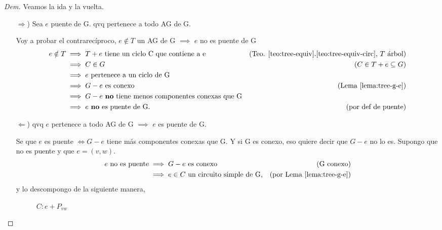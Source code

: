 \documentclass[12pt, a4paper]{report}
\theoremstyle{definition} %
\begin{document}
\begin{proof}[Dem]
    Veamos la ida y la vuelta.

    \begin{enumerate}
        \item[$\Rightarrow$)] Sea $e$ puente de G. qvq pertenece a todo AG de G.
         
        Voy a probar el contrarecíproco, $e \notin T$ un AG de G $\implies$ $e$ no es puente de G
        \begin{align*}
            e \notin T &\implies T+e\ \text{tiene un ciclo C que contiene a e} & \text{(Teo. \ref{teo:tree-equiv}.\ref{teo:tree-equiv-circ}, $T$ árbol)}\\
            &\implies C \in G &(C \in T+e \subseteq G)\\
            &\implies e \text{ pertenece a un ciclo de G}\\
            &\implies G - e \text{ es conexo} &\text{(Lema \ref{lema:tree-g-e})}\\
            &\implies G - e \text{ \textbf{no} tiene menos componentes conexas que G}\\
            &\implies e \text{ \textbf{no} es puente de G.} &\text{(por def de puente)}
        \end{align*}

        \item[$\Leftarrow$)] qvq $e$ pertenece a todo AG de G $\implies$ $e$ es puente de G.

        Se que $e$ es puente $\iff G - e$ tiene más componentes conexas que G. Y si G es conexo, eso quiere decir que $G - e$ no lo es. Supongo que no es puente y que $e = (v, w)$.
        \begin{align*}
            e\ \text{no es puente} &\implies G - e\ \text{es conexo}    & (\text{G conexo})\\
            &\implies e \in C\ \text{un circuito simple de G,} & (\text{por Lema \ref{lema:tree-g-e}})
        \end{align*}
        y lo descompongo de la siguiente manera,

        \begin{figure}[H]
            \centering
            \caption*{$C: e + P_{vw}$}
        \end{figure}


\end{enumerate}
\end{proof}
\end{document}
